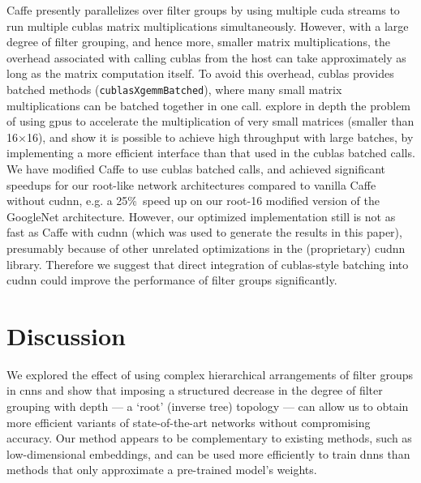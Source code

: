 \documentclass[thesis]{subfiles}
\begin{document}
	Caffe presently parallelizes over filter groups by using multiple \gls{cuda} streams to run multiple \gls{cublas} matrix multiplications simultaneously. However, with a large degree of filter grouping, and hence more, smaller matrix multiplications, the overhead associated with calling \gls{cublas} from the host can take approximately as long as the matrix computation itself. To avoid this overhead, \gls{cublas} provides batched methods (\eg \texttt{cublasXgemmBatched}), where many small matrix multiplications can be batched together in one call. \citet{Jhurani2015} explore in depth the problem of using \gls{gpu}s to accelerate the multiplication of very small matrices (smaller than 16$\times$16), and show it is possible to achieve high throughput with large batches, by implementing a more efficient interface than that used in the \gls{cublas} batched calls.
	We have modified Caffe to use \gls{cublas} batched calls, and achieved significant speedups for our  root-like network architectures compared to vanilla Caffe without \gls{cudnn}, e.g. a 25\%\ speed up on our root-16 modified version of the GoogleNet architecture. However, our optimized implementation still is not as fast as Caffe with \gls{cudnn} (which was used to generate the results in this paper), presumably because of other unrelated optimizations in the (proprietary) \gls{cudnn} library. Therefore we suggest that direct integration of \gls{cublas}-style batching into \gls{cudnn} could improve the performance of filter groups significantly.
	
	\section{Discussion}
	We explored the effect of using complex hierarchical arrangements of filter groups in \glspl{cnn} and show that imposing a structured decrease in the degree of filter grouping with depth --- a `root' (inverse tree) topology --- can allow us to obtain more efficient variants of state-of-the-art networks without compromising accuracy. Our method appears to be complementary to existing methods, such as low-dimensional embeddings, and can be used more efficiently to train \glspl{dnn} than methods that only approximate a pre-trained model's weights.
	
\end{document}
